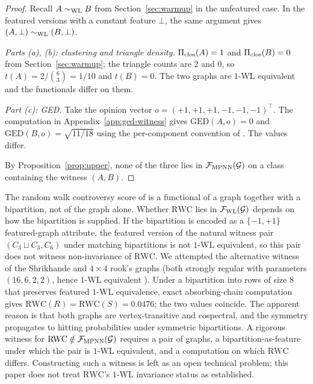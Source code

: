 \begin{proof}
Recall $A \sim_{\mathrm{WL}} B$ from Section~\ref{sec:warmup} in the unfeatured
case. In the featured versions with a constant feature $\bot$, the
same argument gives $(A, \bot) \sim_{\mathrm{WL}} (B, \bot)$.

\emph{Parts (a), (b): clustering and triangle density.} $\Pi_{\mathrm{clos}}(A)
= 1$ and $\Pi_{\mathrm{clos}}(B) = 0$ from Section~\ref{sec:warmup}; the triangle
counts are $2$ and $0$, so $t(A) = 2/\binom{6}{3} = 1/10$ and $t(B)
= 0$. The two graphs are $1$-WL equivalent and the functionals
differ on them.

\emph{Part (c): GED.} Take the opinion vector $o = (+1, +1, +1, -1,
-1, -1)^\top$. The computation in Appendix~\ref{app:ged-witness} gives
$\mathrm{GED}(A, o) = 0$ and $\mathrm{GED}(B, o) = \sqrt{11/18}$
using the per-component convention of \citet{HohmannGED2023}. The
values differ.

By Proposition~\ref{prop:upper}, none of the three lies in
$\mathcal{F}_{\mathrm{MPNN}}(\mathcal{G})$ on a class containing the
witness $(A, B)$.
\end{proof}

\begin{remark}
\label{rem:rwc}
The random walk controversy score of \citet{Garimella18} is a
functional of a graph together with a bipartition, not of the
graph alone. Whether $\mathrm{RWC}$ lies in
$\mathcal{F}_{\mathrm{WL}}(\mathcal{G})$ depends on how the bipartition is
supplied. If the bipartition is encoded as a $\{-1, +1\}$
featured-graph attribute, the featured version of the natural
witness pair $(C_3 \sqcup C_3, C_6)$ under matching bipartitions is
not $1$-WL equivalent, so this pair does not witness non-invariance
of $\mathrm{RWC}$. We attempted the alternative witness of the
Shrikhande and $4 \times 4$ rook's graphs (both strongly regular with
parameters $(16, 6, 2, 2)$, hence $1$-WL equivalent
\citep{Shrikhande1959}). Under a bipartition into rows of size $8$
that preserves featured $1$-WL equivalence, exact absorbing-chain
computation gives $\mathrm{RWC}(R) = \mathrm{RWC}(S) = 0.0476$;
the two values coincide. The apparent reason is that both graphs
are vertex-transitive and cospectral, and the symmetry propagates
to hitting probabilities under symmetric bipartitions. A rigorous
witness for $\mathrm{RWC} \notin \mathcal{F}_{\mathrm{MPNN}}(\mathcal{G})$
requires a pair of graphs, a bipartition-as-feature under which the
pair is $1$-WL equivalent, and a computation on which $\mathrm{RWC}$
differs. Constructing such a witness is left as an open technical
problem; this paper does not treat $\mathrm{RWC}$'s $1$-WL
invariance status as established.
\end{remark}

